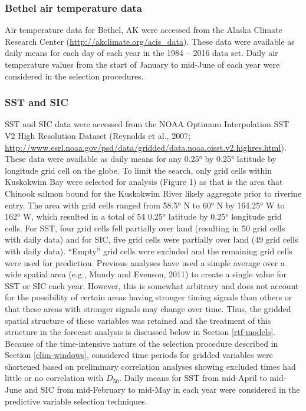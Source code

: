 \documentclass[12pt,]{book}
\theoremstyle{definition}
\theoremstyle{definition}
\theoremstyle{definition}
\theoremstyle{remark}
\begin{document}
\subsubsection{Bethel air temperature
data}\label{bethel-air-temperature-data}

\noindent
Air temperature data for Bethel, AK were accessed from the Alaska
Climate Research Center (\url{http://akclimate.org/acis_data}). These
data were available as daily means for each day of each year in the 1984
-- 2016 data set. Daily air temperature values from the start of January
to mid-June of each year were considered in the selection procedures.

\subsubsection{SST and SIC}\label{sst-and-sic}

\noindent
SST and SIC data were accessed from the NOAA Optimum Interpolation SST
V2 High Resolution Dataset (Reynolds et al., 2007;
\url{http://www.esrl.noaa.gov/psd/data/gridded/data.noaa.oisst.v2.highres.html}).
These data were available as daily means for any 0.25° by 0.25° latitude
by longitude grid cell on the globe. To limit the search, only grid
cells within Kuskokwim Bay were selected for analysis (Figure 1) as that
is the area that Chinook salmon bound for the Kuskokwim River likely
aggregate prior to riverine entry. The area with grid cells ranged from
58.5° N to 60° N by 164.25° W to 162° W, which resulted in a total of 54
0.25° latitude by 0.25° longitude grid cells. For SST, four grid cells
fell partially over land (resulting in 50 grid cells with daily data)
and for SIC, five grid cells were partially over land (49 grid cells
with daily data). ``Empty'' grid cells were excluded and the remaining
grid cells were used for prediction. Previous analyses have used a
simple average over a wide spatial area (e.g., Mundy and Evenson, 2011)
to create a single value for SST or SIC each year. However, this is
somewhat arbitrary and does not account for the possibility of certain
areas having stronger timing signals than others or that these areas
with stronger signals may change over time. Thus, the gridded spatial
structure of these variables was retained and the treatment of this
structure in the forecast analysis is discussed below in Section
\ref{rtf-models}. Because of the time-intensive nature of the selection
procedure described in Section \ref{clim-windows}, considered time
periods for gridded variables were shortened based on preliminary
correlation analyses showing excluded times had little or no correlation
with \(D_{50}\). Daily means for SST from mid-April to mid-June and SIC
from mid-February to mid-May in each year were considered in the
predictive variable selection techniques.
\end{document}
